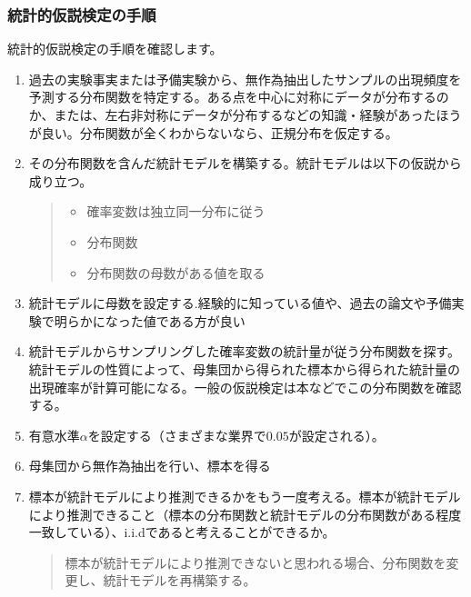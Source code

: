 \documentclass[a4paper,11pt,dvipdfmx]{jsarticle}
\begin{document}
\subsubsection{統計的仮説検定の手順}
統計的仮説検定の手順を確認します。
\begin{framed}
    \begin{enumerate}
        \item 過去の実験事実または予備実験から、無作為抽出したサンプルの出現頻度を予測する分布関数を特定する。ある点を中心に対称にデータが分布するのか、または、左右非対称にデータが分布するなどの知識・経験があったほうが良い。分布関数が全くわからないなら、正規分布を仮定する。
        \item その分布関数を含んだ統計モデルを構築する。統計モデルは以下の仮説から成り立つ。
        \begin{quote}
            \begin{itemize}
                \item 確率変数は独立同一分布に従う
                \item 分布関数
                \item 分布関数の母数がある値を取る
            \end{itemize}
        \end{quote}
        \item 統計モデルに母数を設定する.経験的に知っている値や、過去の論文や予備実験で明らかになった値である方が良い
        \item 統計モデルからサンプリングした確率変数の統計量が従う分布関数を探す。統計モデルの性質によって、母集団から得られた標本から得られた統計量の出現確率が計算可能になる。一般の仮説検定は本などでこの分布関数を確認する。
        \item 有意水準$\alpha$を設定する（さまざまな業界で$0.05$が設定される）。
        \item 母集団から無作為抽出を行い、標本を得る
        \item 標本が統計モデルにより推測できるかをもう一度考える。標本が統計モデルにより推測できること（標本の分布関数と統計モデルの分布関数がある程度一致している）、i.i.dであると考えることができるか。
        \begin{quote}
            標本が統計モデルにより推測できないと思われる場合、分布関数を変更し、統計モデルを再構築する。


\end{quote}
\end{enumerate}
\end{framed}
\end{document}
